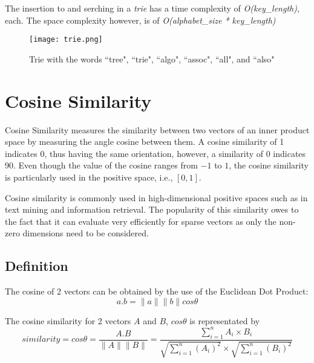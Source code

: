		The insertion to and serching in a \emph{trie} has a time complexity of \emph{O(key\_length)}, each. The space complexity however, is of \emph{O(alphabet\_size * key\_length)}
		
		\begin{figure}[ht!]
			\centering
			\texttt{[image: trie.png]}
			\caption{Trie with the words ``tree", ``trie", ``algo", ``assoc", ``all", and ``also" \label{trie}}
		\end{figure}
	
	\section{Cosine Similarity}	
	\label{sec:cosine_similarity}
		Cosine Similarity \cite{singhal2001modern} measures the similarity between two vectors of an inner product space by measuring the angle cosine between them. A cosine similarity of 1 indicates 0\textdegree, thus having the same orientation, however, a similarity of 0 indicates 90\textdegree. Even though the value of the cosine ranges from \(-1\) to \(1\), the cosine similarity is particularly used in the positive space, i.e., \([0,1]\).
		
		Cosine similarity is commonly used in high-dimensional positive spaces such as in text mining and information retrieval. The popularity of this similarity owes to the fact that it can evaluate very efficiently for sparse vectors as only the non-zero dimensions need to be considered.
		
		\subsection{Definition}
			The cosine of 2 vectors can be obtained by the use of the Euclidean Dot Product:
			\[ a . b = \|a\| \|b\| cos \theta \]
			
			The cosine similarity for 2 vectors \(A\) and \(B\), \(cos \theta \) is representated by
			\[ similarity = cos \theta = \frac{A.B}{\|A\|\|B\|} = \frac{\displaystyle\sum_{i=1}^{n} A_i \times B_i}{\sqrt{\displaystyle\sum_{i=1}^{n} (A_i) ^ 2} \times \sqrt{\displaystyle\sum_{i=1}^{n} (B_i) ^ 2}} \]
